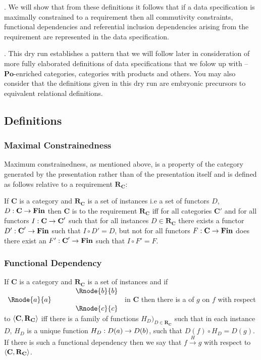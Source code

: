 \documentclass[10pt,a4paper]{article}
\theoremstyle{remark}
\newcommand{\catc}[1][C]{\textbf{#1}}
\newcommand{\catcp}[1][C]{\textbf{#1}'}
\newcommand{\reqt}{\textbf{R}}
\newcommand{\reqtc}[1][\catc]{\reqt_{#1}}
\newcommand{\Fin}{\ensuremath{\textbf{Fin}} }
\newcommand{\Po}{\ensuremath{\textbf{Po}} }
\newcommand{\fundep}[3]{#2 \xrightarrow{#1} #3}
\newlength{\oldparindent}
\newcommand{\ind}{\hspace*{\oldparindent}}
\newcounter{para}
\newcommand\note{\par\ind\refstepcounter{para}\thepara.\space}
\begin{document}
\note
We will show that from these definitions it follows that if a data specification is maximally constrained to a
requirement then  all commutivity constraints,  functional dependencies and referential inclusion dependencies arising from the requirement are represented in the data specification.

\note 
This dry run establishes a pattern that we will follow later in consideration of more fully elaborated 
definitions of 
data specifications that we folow up with -- $\Po$-enriched categories, categories with products and others. 
You may also consider that the definitions given in this dry run are embryonic precursors to equivalent relational definitions.

\subsection {Definitions}
\subsubsection{Maximal Constrainedness}
Maximum constrainedness, as mentioned above, is a property of the category generated by the presentation  rather than of the presentation itself and is defined as follows relative to a requirement $\reqtc$:

\begin{definition}
If $\catc$ is a category and $\reqtc$ is a set of instances i.e a set of functors $D$, $D: \catc \morph \Fin$ then $\catc$ is 
 to the requirement $\reqtc$ iff for all categories $\catcp$ and for all functors 
$I:\catc \morph \catcp$ such that for all instances $D \in \reqtc$ there exists a functor $D':\catcp \morph \Fin$
such that $I \circ D'=D$, but not for all functors $F: \catc \morph \Fin$ 
does there exist an $F' : \catcp \morph \Fin$ such that $I \circ F'=F$.
\end{definition}

\subsubsection{Functional Dependency}
\begin{definition}
If $\catc$ is a category and $\reqtc$ is a set of instances and if
$
\begin{array}{c p{0.5cm} c  }
             &&   \Rnode{b}{b} \\[0.01cm]
\Rnode{a}{a} &&                \\[0.01cm] 
             &&   \Rnode{c}{c}         
\end{array} 
$
in $\catc$ then there is a   of $g$ on $f$ with respect to $\tuple{\catc,\reqtc}$ iff
there is a family of functions $H_D)_{D \in \reqtc}$ such that 
in each instance $D$, $H_D$ is a unique function $H_D: D(a) \rightarrow D(b)$, such that $D(f) \circ H_D = D(g)$. 
If there is such a functional dependency then we say that $\fundep{H}{f}{g}$ with respect to $\tuple{\catc,\reqtc}$.
\end{definition}
\end{document}
